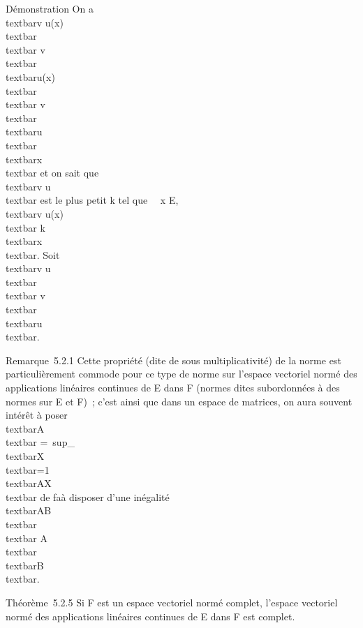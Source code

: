 \documentclass[]{article}
\begin{document}
Démonstration On a \\textbar{}v \cdot
u(x)\\textbar{} \leq\\textbar{}
v\\textbar{}\,\\textbar{}u(x)\\textbar{}
\leq\\textbar{}
v\\textbar{}\,\\textbar{}u\\textbar{}\,\\textbar{}x\\textbar{}
et on sait que \\textbar{}v \cdot u\\textbar{}
est le plus petit k tel que \forall~~x \in E,
\\textbar{}v \cdot u(x)\\textbar{} \leq
k\\textbar{}x\\textbar{}. Soit
\\textbar{}v \cdot u\\textbar{}
\leq\\textbar{}
v\\textbar{}\,\\textbar{}u\\textbar{}.

Remarque~5.2.1 Cette propriété (dite de sous multiplicativité) de la
norme est particulièrement commode pour ce type de norme sur l'espace
vectoriel normé des applications linéaires continues de E dans F (normes
dites subordonnées à des normes sur E et F)~; c'est ainsi que dans un
espace de matrices, on aura souvent intérêt à poser
\\textbar{}A\\textbar{}
=\
sup\_\\textbar{}X\\textbar{}=1\\textbar{}AX\\textbar{}
de fa\ccon à disposer d'une inégalité
\\textbar{}AB\\textbar{}
\leq\\textbar{}
A\\textbar{}\,\\textbar{}B\\textbar{}.

Théorème~5.2.5 Si F est un espace vectoriel normé complet, l'espace
vectoriel normé des applications linéaires continues de E dans F est
complet.
\end{document}
